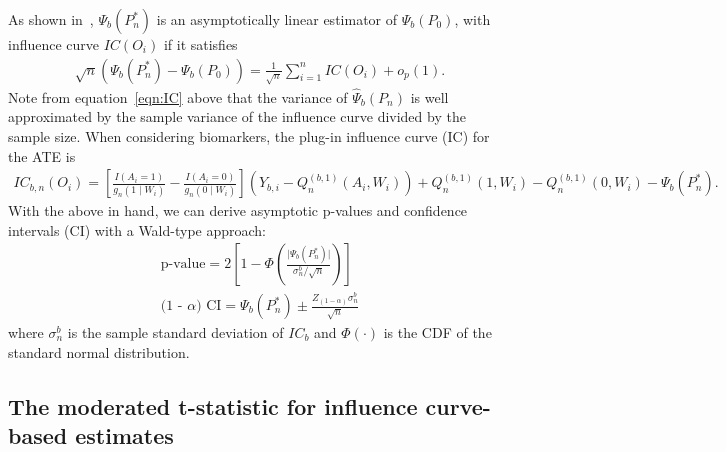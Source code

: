 As shown in~\cite{van2011targeted}, $\Psi_b(P^*_n)$ is an asymptotically
linear estimator of $\Psi_b(P_0)$, with influence curve $IC(O_i)$ if it
satisfies
\begin{eqnarray}
\sqrt{n}(\Psi_b(P^*_n) - \Psi_b(P_0)) = \frac{1}{\sqrt{n}}\sum^{n}_{i = 1}IC(O_i) + o_p(1).
\label{eqn:IC}
\end{eqnarray}
Note from equation~\ref{eqn:IC} above that the variance of $\hat{\Psi}_b(P_n)$
is well approximated by the sample variance of the influence curve divided by
the sample size. When considering biomarkers, the plug-in influence curve (IC)
for the ATE is
\begin{eqnarray*}
IC_{b, n}(O_i) = \left[ \frac{I(A_i = 1)}{g_n(1 \mid W_i)} - \frac{I(A_i = 0)}
  {g_n(0 \mid W_i)} \right] (Y_{b, i} - Q^{(b, 1)}_{n}(A_i, W_i)) +
  Q^{(b, 1)}_{n}(1, W_i) - Q^{(b,1)}_{n}(0, W_i) - \Psi_b(P^*_n).
\end{eqnarray*}
With the above in hand, we can derive asymptotic p-values and confidence
intervals (CI) with a Wald-type approach:
\begin{eqnarray}
\mbox{p-value} = 2 \left[ 1 -
  \Phi(\frac{\vert\Psi_b(P^*_n)\vert}{\sigma^b_n/\sqrt{n}}) \right] \\
\mbox{(1 - $\alpha$) CI} = \Psi_b(P^*_n) \pm
  \frac{Z_{(1 - \alpha)} \sigma^b_{n}}{\sqrt{n}}
\label{eqn:tmleInference}
\end{eqnarray}
where $\sigma^b_{n}$ is the sample standard deviation of $IC_b$ and
$\Phi(\cdot)$ is the CDF of the standard normal distribution.

\subsection{The moderated t-statistic for influence curve-based
estimates}\label{modtIC}

